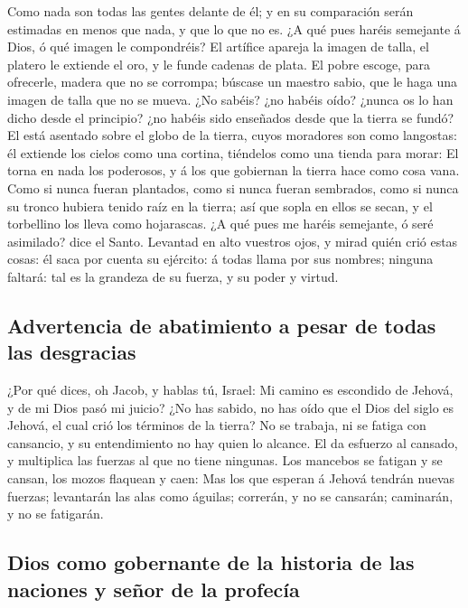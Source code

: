  Como nada son todas las gentes delante de él; y en su
comparación serán estimadas en menos que nada, y que lo que no es.
 ¿A qué pues haréis semejante á Dios, ó qué imagen le
compondréis?  El artífice apareja la imagen de talla, el
platero le extiende el oro, y le funde cadenas de plata. 
El pobre escoge, para ofrecerle, madera que no se corrompa; búscase un
maestro sabio, que le haga una imagen de talla que no se mueva.
 ¿No sabéis? ¿no habéis oído? ¿nunca os lo han dicho desde
el principio? ¿no habéis sido enseñados desde que la tierra se fundó?
 El está asentado sobre el globo de la tierra, cuyos
moradores son como langostas: él extiende los cielos como una cortina,
tiéndelos como una tienda para morar:  El torna en nada los
poderosos, y á los que gobiernan la tierra hace como cosa vana.
 Como si nunca fueran plantados, como si nunca fueran
sembrados, como si nunca su tronco hubiera tenido raíz en la tierra; así
que sopla en ellos se secan, y el torbellino los lleva como hojarascas.
 ¿A qué pues me haréis semejante, ó seré asimilado? dice el
Santo.  Levantad en alto vuestros ojos, y mirad quién crió
estas cosas: él saca por cuenta su ejército: á todas llama por sus
nombres; ninguna faltará: tal es la grandeza de su fuerza, y su poder y
virtud.

\hypertarget{advertencia-de-abatimiento-a-pesar-de-todas-las-desgracias}{%
\subsection{Advertencia de abatimiento a pesar de todas las
desgracias}\label{advertencia-de-abatimiento-a-pesar-de-todas-las-desgracias}}

 ¿Por qué dices, oh Jacob, y hablas tú, Israel: Mi camino
es escondido de Jehová, y de mi Dios pasó mi juicio?  ¿No
has sabido, no has oído que el Dios del siglo es Jehová, el cual crió
los términos de la tierra? No se trabaja, ni se fatiga con cansancio, y
su entendimiento no hay quien lo alcance.  El da esfuerzo
al cansado, y multiplica las fuerzas al que no tiene ningunas.
 Los mancebos se fatigan y se cansan, los mozos flaquean y
caen:  Mas los que esperan á Jehová tendrán nuevas fuerzas;
levantarán las alas como águilas; correrán, y no se cansarán; caminarán,
y no se fatigarán.

\hypertarget{dios-como-gobernante-de-la-historia-de-las-naciones-y-seuxf1or-de-la-profecuxeda}{%
\subsection{Dios como gobernante de la historia de las naciones y señor
de la
profecía}\label{dios-como-gobernante-de-la-historia-de-las-naciones-y-seuxf1or-de-la-profecuxeda}}

